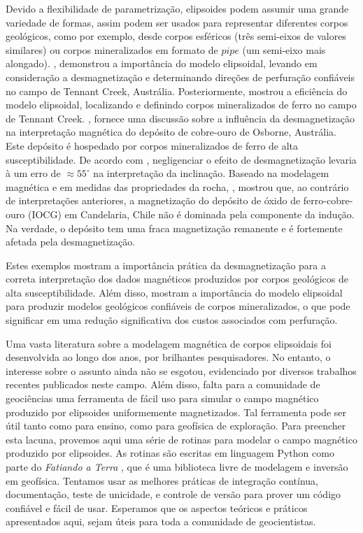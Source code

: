 Devido a flexibilidade  de parametrização, elipsoides podem assumir uma grande variedade de formas, assim podem ser 
usados para representar diferentes corpos geológicos, como por exemplo, desde corpos esféricos (três semi-eixos 
de valores similares) ou corpos mineralizados em formato de $pipe$ (um semi-eixo mais alongado).
\citet{farrar1979}, demonstrou a importância do modelo elipsoidal, levando
em consideração a desmagnetização e determinando direções de 
perfuração confiáveis no campo de Tennant Creek, Austrália.
Posteriormente, \citet{hoschke1991} mostrou a eficiência do
modelo elipsoidal, localizando e definindo corpos mineralizados de ferro no campo de Tennant Creek.
\citet{clark2000}, fornece uma discussão sobre a influência da desmagnetização na interpretação magnética do depósito de cobre-ouro de Osborne, Austrália. Este depósito é hospedado por corpos mineralizados de ferro de alta susceptibilidade. De acordo com \citet{clark2000}, negligenciar o efeito de desmagnetização levaria à um erro de $\approx 55^{\circ}$ na interpretação da inclinação.
Baseado na modelagem magnética e em medidas das propriedades da rocha, \citet{austin2014}, mostrou que, ao contrário de interpretações anteriores, a magnetização do depósito de óxido de ferro-cobre-ouro (IOCG) em Candelaria, Chile não é dominada pela componente da indução. Na verdade, o depósito tem uma fraca magnetização remanente e é fortemente afetada pela desmagnetização.

Estes exemplos mostram a importância prática da desmagnetização para a correta interpretação dos dados magnéticos produzidos por corpos geológicos de alta susceptibilidade.
Além disso, mostram a importância do modelo elipsoidal para produzir modelos geológicos confiáveis de corpos mineralizados, o que pode significar em uma redução significativa dos custos associados com perfuração.

Uma vasta literatura sobre a modelagem magnética de corpos elipsoidais foi desenvolvida ao longo dos anos, por brilhantes pesquisadores. No entanto, o interesse sobre o assunto ainda não se esgotou, evidenciado por diversos trabalhos recentes publicados neste campo. Além disso, falta para a comunidade de geociências uma ferramenta de fácil uso para simular o campo magnético produzido por elipsoides uniformemente magnetizados. Tal ferramenta pode ser útil tanto como para ensino, como para geofísica de exploração. Para preencher esta lacuna, provemos aqui uma série de rotinas para modelar o campo magnético produzido por elipsoides. As rotinas são escritas em linguagem Python como parte do \textit{Fatiando a Terra} \citep{uieda-proc-scipy-2013}, que é uma biblioteca livre de modelagem e inversão em geofísica. Tentamos usar as melhores práticas de integração contínua, documentação, teste de unicidade, e controle de versão para prover um código confiável e fácil de usar. Esperamos que os aspectos teóricos e práticos apresentados aqui, sejam úteis para toda a comunidade de geocientistas.

